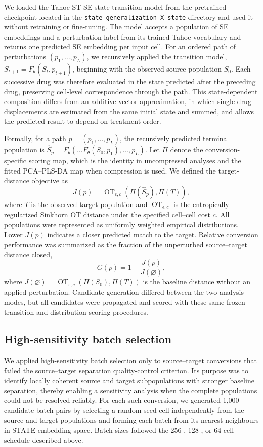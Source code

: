\documentclass[11pt,a4paper]{article}
\begin{document}
We loaded the Tahoe ST-SE state-transition model from the pretrained checkpoint located in the \texttt{state\_generalization\_X\_state} directory and used it without retraining or fine-tuning. The model accepts a population of SE embeddings and a perturbation label from its trained Tahoe vocabulary and returns one predicted SE embedding per input cell. For an ordered path of perturbations $(p_1,\ldots,p_L)$, we recursively applied the transition model, $S_{t+1}=F_{\theta}(S_t,p_{t+1})$, beginning with the observed source population $S_0$. Each successive drug was therefore evaluated in the state predicted after the preceding drug, preserving cell-level correspondence through the path. This state-dependent composition differs from an additive-vector approximation, in which single-drug displacements are estimated from the same initial state and summed, and allows the predicted result to depend on treatment order.

Formally, for a path $p=(p_1,\ldots,p_L)$, the recursively predicted terminal population is $\hat S_p=F_{\theta}(\ldots F_{\theta}(S_0,p_1),\ldots,p_L)$. Let $\Pi$ denote the conversion-specific scoring map, which is the identity in uncompressed analyses and the fitted PCA--PLS-DA map when compression is used. We defined the target-distance objective as
\begin{equation}
J(p)=\operatorname{OT}_{\epsilon,c}\!\left(\Pi(\hat S_p),\Pi(T)\right),
\end{equation}
where $T$ is the observed target population and $\operatorname{OT}_{\epsilon,c}$ is the entropically regularized Sinkhorn OT distance under the specified cell--cell cost $c$. All populations were represented as uniformly weighted empirical distributions. Lower $J(p)$ indicates a closer predicted match to the target. Relative conversion performance was summarized as the fraction of the unperturbed source--target distance closed,
\begin{equation}
G(p)=1-\frac{J(p)}{J(\varnothing)},
\end{equation}
where $J(\varnothing)=\operatorname{OT}_{\epsilon,c}(\Pi(S_0),\Pi(T))$ is the baseline distance without an applied perturbation. Candidate generation differed between the two analysis modes, but all candidates were propagated and scored with these same frozen transition and distribution-scoring procedures.

\subsection{High-sensitivity batch selection}
We applied high-sensitivity batch selection only to source--target conversions that failed the source--target separation quality-control criterion. Its purpose was to identify locally coherent source and target subpopulations with stronger baseline separation, thereby enabling a sensitivity analysis when the complete populations could not be resolved reliably. For each such conversion, we generated 1,000 candidate batch pairs by selecting a random seed cell independently from the source and target populations and forming each batch from its nearest neighbours in STATE embedding space. Batch sizes followed the 256-, 128-, or 64-cell schedule described above.
\end{document}
